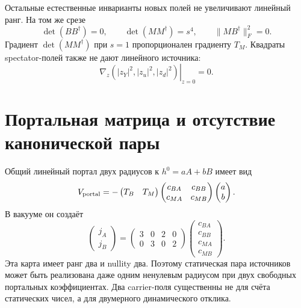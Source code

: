 Остальные естественные инварианты новых полей не увеличивают линейный ранг.
На том же срезе
\begin{equation}
 \det(BB^\dagger)=0,
 \qquad \det(MM^\dagger)=s^4,
 \qquad \|MB^\dagger\|_F^2=0.
 \label{eq:v8-two-source-carriers-dependent-invariants}
\end{equation}
Градиент $\det(MM^\dagger)$ при $s=1$ пропорционален градиенту $T_M$.
Квадраты spectator-полей также не дают линейного источника:
\begin{equation}
 \left.\nabla_z(|z_Y|^2,|z_u|^2,|z_d|^2)\right|_{z=0}=0.
 \label{eq:v8-two-source-carriers-spectator-zero}
\end{equation}

\section{Портальная матрица и отсутствие канонической пары}

Общий линейный портал двух радиусов к $h^0=aA+bB$ имеет вид
\begin{equation}
 V_{\rm portal}=-
 \begin{pmatrix}T_B&T_M\end{pmatrix}
 \begin{pmatrix}c_{BA}&c_{BB}\\c_{MA}&c_{MB}\end{pmatrix}
 \begin{pmatrix}a\\b\end{pmatrix}.
 \label{eq:v8-two-source-carriers-portal-matrix}
\end{equation}
В вакууме он создаёт
\begin{equation}
 \begin{pmatrix}j_A\\j_B\end{pmatrix}
 =\begin{pmatrix}3&0&2&0\\0&3&0&2\end{pmatrix}
 \begin{pmatrix}c_{BA}\\c_{BB}\\c_{MA}\\c_{MB}\end{pmatrix}.
 \label{eq:v8-two-source-carriers-coefficient-map}
\end{equation}
Эта карта имеет ранг два и nullity два. Поэтому статическая пара источников
может быть реализована даже одним ненулевым радиусом при двух свободных
портальных коэффициентах. Два carrier-поля существенны не для счёта
статических чисел, а для двумерного динамического отклика.

